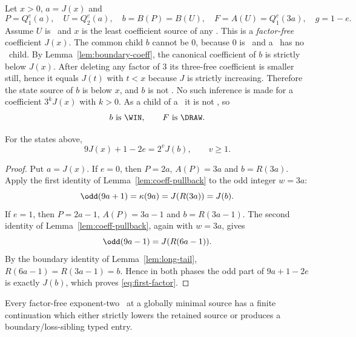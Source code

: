 Let $x>0$, $a=J(x)$ and
\[
  P=Q_1^e(a),\quad U=Q_2^e(a),\quad
  b=B(P)=B(U),\quad F=A(U)=Q_1^e(3a),\quad g=1-e.
\]
Assume $U$ is \DRAW\ and $x$ is the least coefficient source of any \DRAW.  This is a \emph{factor-free} coefficient $J(x)$.  The common child $b$ cannot be $0$, because $0$ is \LOSS\ and a \DRAW\ has no \LOSS\ child.  By Lemma~\ref{lem:boundary-coeff}, the canonical coefficient of $b$ is strictly below $J(x)$.  After deleting any factor of $3$ its three-free coefficient is smaller still, hence it equals $J(t)$ with $t<x$ because $J$ is strictly increasing.  Therefore the state source of $b$ is below $x$, and $b$ is not \DRAW.  No such inference is made for a coefficient $3^kJ(x)$ with $k>0$.
As a child of a \DRAW\ it is not \LOSS, so
\[
  b\text{ is \WIN},\qquad F\text{ is \DRAW}.
\]
\begin{lemma}\label{lem:first-factor}
For the states above,
\begin{equation}\label{eq:first-factor}
  9J(x)+1-2e=2^vJ(b),\qquad v\ge1.
\end{equation}
\end{lemma}

\begin{proof}
Put $a=J(x)$. If $e=0$, then $P=2a$, $A(P)=3a$ and $b=R(3a)$.
Apply the first identity of Lemma~\ref{lem:coeff-pullback} to the odd integer
$w=3a$:
\[
 \odd(9a+1)=\kappa(9a)=J(R(3a))=J(b).
\]
If $e=1$, then $P=2a-1$, $A(P)=3a-1$ and $b=R(3a-1)$. The second identity
of Lemma~\ref{lem:coeff-pullback}, again with $w=3a$, gives
\[
 \odd(9a-1)=J(R(6a-1)).
\]
By the boundary identity of Lemma~\ref{lem:long-tail},
$R(6a-1)=R(3a-1)=b$. Hence in both phases the odd part of
$9a+1-2e$ is exactly $J(b)$, which proves \eqref{eq:first-factor}.
\end{proof}

\begin{proposition}\label{prop:base-entry}
Every factor-free exponent-two \DRAW\ at a globally minimal source has a
finite continuation which either strictly lowers the retained source or
produces a boundary/loss-sibling typed entry.
\end{proposition}

